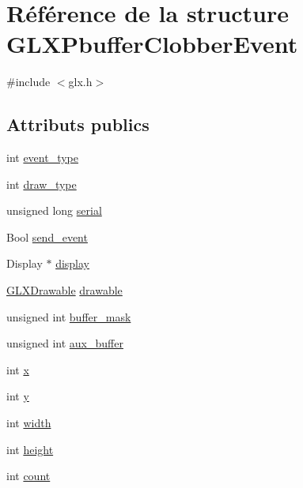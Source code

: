 \hypertarget{struct_g_l_x_pbuffer_clobber_event}{\section{Référence de la structure G\-L\-X\-Pbuffer\-Clobber\-Event}
\label{struct_g_l_x_pbuffer_clobber_event}
}


{\ttfamily \#include $<$glx.\-h$>$}

\subsection*{Attributs publics}
\begin{DoxyCompactItemize}
\item 
int \hyperlink{struct_g_l_x_pbuffer_clobber_event_a30d7162d8d77246b01f5e610cda4da68}{event\-\_\-type}
\item 
int \hyperlink{struct_g_l_x_pbuffer_clobber_event_a243f92b79d3cfbde73eab02815be2320}{draw\-\_\-type}
\item 
unsigned long \hyperlink{struct_g_l_x_pbuffer_clobber_event_a6390b2875ae06a4cb827d2b4c321eda3}{serial}
\item 
Bool \hyperlink{struct_g_l_x_pbuffer_clobber_event_aa51969e67e4ad6095bda26ca64fe8ba6}{send\-\_\-event}
\item 
Display $\ast$ \hyperlink{struct_g_l_x_pbuffer_clobber_event_aeb49bb93cc59448e75d66170a39596d1}{display}
\item 
\hyperlink{glx_8h_a826f51745d9d6c81bdbac47ae2b80cf7}{G\-L\-X\-Drawable} \hyperlink{struct_g_l_x_pbuffer_clobber_event_a388908b766e35205c1a461ea8b60439f}{drawable}
\item 
unsigned int \hyperlink{struct_g_l_x_pbuffer_clobber_event_aff4c23d00f6dad98427f8d32a5f10580}{buffer\-\_\-mask}
\item 
unsigned int \hyperlink{struct_g_l_x_pbuffer_clobber_event_a13193b6e7e3e52b15f754fe91403b7ec}{aux\-\_\-buffer}
\item 
int \hyperlink{struct_g_l_x_pbuffer_clobber_event_a8f0a7162a033c89ee94ce535580dbc32}{x}
\item 
int \hyperlink{struct_g_l_x_pbuffer_clobber_event_a69eb7ac60d36ac3ec4550ac206cfc61f}{y}
\item 
int \hyperlink{struct_g_l_x_pbuffer_clobber_event_aaca375fecb872c73c60cd5d0bfc7c7a5}{width}
\item 
int \hyperlink{struct_g_l_x_pbuffer_clobber_event_aed4e539c896bdad15217bf92c28f8520}{height}
\item 
int \hyperlink{struct_g_l_x_pbuffer_clobber_event_a61e9f6b31738464dca67f909fcacd298}{count}
\end{DoxyCompactItemize}


